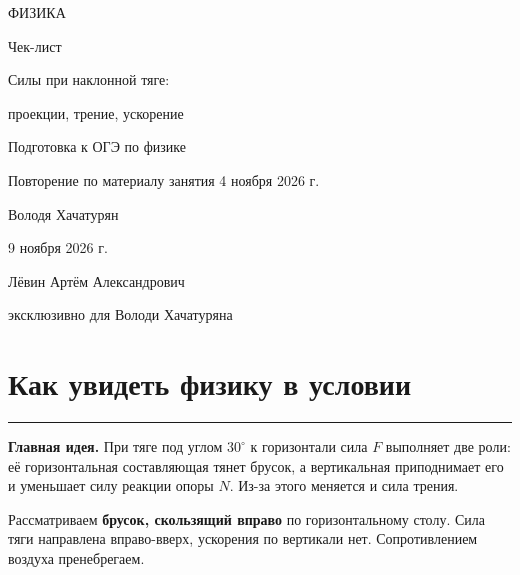 \documentclass[a4paper,12pt]{article}
\newcommand{\sect}[1]{\section{#1}\vspace{-1.0em}\noindent\textcolor{accent}{\rule{\linewidth}{.5pt}}\par\vspace{.4em}}
\newcommand{\key}[1]{{\color{darkaccent}\bfseries #1}}
\begin{document}
\thispagestyle{empty}
\begin{center}
\vspace*{24mm}
{\large\color{darkaccent} ФИЗИКА}\par
\vspace{13mm}
{\LARGE Чек-лист}\par
\vspace{13mm}
{\Large\color{accent} Силы при наклонной тяге:}\par
{\Large\color{accent} проекции, трение, ускорение}\par
\vspace{15mm}
{\normalsize Подготовка к ОГЭ по физике}\par
{\normalsize Повторение по материалу занятия 4 ноября 2026 г.}\par
\vfill
{\large Володя Хачатурян}\par
\vspace{9mm}
{9 ноября 2026 г.}\par
\vspace{14mm}
{\small Лёвин Артём Александрович}\par
{\small эксклюзивно для Володи Хачатуряна}\par
\vspace{17mm}
\end{center}
\clearpage
{}
\setcounter{page}{1}

\sect{Как увидеть физику в условии}

\key{Главная идея.} При тяге под углом $30^\circ$ к горизонтали сила $F$ выполняет две роли: её горизонтальная составляющая тянет брусок, а вертикальная приподнимает его и уменьшает силу реакции опоры $N$. Из-за этого меняется и сила трения.

Рассматриваем \textbf{брусок, скользящий вправо} по горизонтальному столу. Сила тяги направлена вправо-вверх, ускорения по вертикали нет. Сопротивлением воздуха пренебрегаем.
\end{document}
